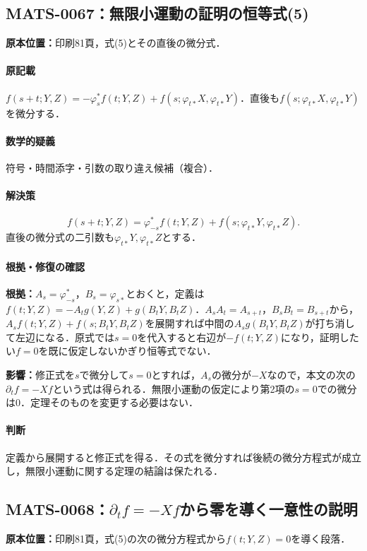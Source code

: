 \documentclass[a4paper,10pt]{ltjsarticle}
\begin{document}
\subsection*{MATS-0067：無限小運動の証明の恒等式(5)}\label{math:MATS-0067}
\noindent\textbf{原本位置：}印刷81頁，式(5)とその直後の微分式．

\paragraph{原記載}$f(s+t;Y,Z)=-\varphi_s^*f(t;Y,Z)+f(s;\varphi_{t*}X,\varphi_{t*}Y)$．直後も$f(s;\varphi_{t*}X,\varphi_{t*}Y)$を微分する．

\paragraph{数学的疑義}符号・時間添字・引数の取り違え候補（複合）．

\paragraph{解決策}\[f(s+t;Y,Z)=\varphi_{-s}^*f(t;Y,Z)+f(s;\varphi_{t*}Y,\varphi_{t*}Z).\]
直後の微分式の二引数も$\varphi_{t*}Y,\varphi_{t*}Z$とする．

\paragraph{根拠・修復の確認}\textbf{根拠：}$A_s=\varphi_{-s}^*$，$B_s=\varphi_{s*}$とおくと，定義は$f(t;Y,Z)=-A_tg(Y,Z)+g(B_tY,B_tZ)$．$A_sA_t=A_{s+t}$，$B_sB_t=B_{s+t}$から，$A_s f(t;Y,Z)+f(s;B_tY,B_tZ)$を展開すれば中間の$A_sg(B_tY,B_tZ)$が打ち消して左辺になる．原式では$s=0$を代入すると右辺が$-f(t;Y,Z)$になり，証明したい$f=0$を既に仮定しないかぎり恒等式でない．

\textbf{影響：}修正式を$s$で微分して$s=0$とすれば，$A_s$の微分が$-X$なので，本文の次の$\partial_t f=-Xf$という式は得られる．無限小運動の仮定により第2項の$s=0$での微分は0．定理そのものを変更する必要はない．

\paragraph{判断}定義から展開すると修正式を得る．その式を微分すれば後続の微分方程式が成立し，無限小運動に関する定理の結論は保たれる．


\subsection*{MATS-0068：$\partial_t f=-Xf$から零を導く一意性の説明}\label{math:MATS-0068}
\noindent\textbf{原本位置：}印刷81頁，式(5)の次の微分方程式から$f(t;Y,Z)=0$を導く段落．
\end{document}
